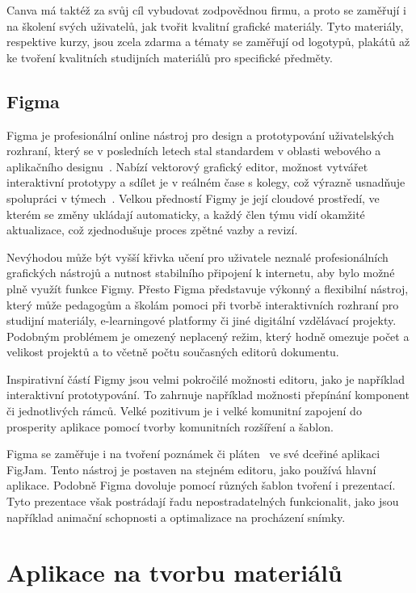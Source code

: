Canva má taktéž za svůj cíl vybudovat zodpovědnou firmu, a proto se zaměřují i na školení svých uživatelů, jak tvořit kvalitní grafické materiály.
Tyto materiály, respektive kurzy, jsou zcela zdarma a tématy se zaměřují od logotypů, plakátů až ke tvoření kvalitních studijních materiálů pro specifické předměty.


\subsection{Figma}\label{text:figma_popis}

Figma je profesionální online nástroj pro design a prototypování uživatelských rozhraní, který se v posledních letech stal standardem v oblasti webového a aplikačního designu~\cite{figma_website}. 
Nabízí vektorový grafický editor, možnost vytvářet interaktivní prototypy a sdílet je v reálném čase s kolegy, což výrazně usnadňuje spolupráci v týmech~\cite{figma_website}. 
Velkou předností Figmy je její cloudové prostředí, ve kterém se změny ukládají automaticky, a každý člen týmu vidí okamžité aktualizace, což zjednodušuje proces zpětné vazby a revizí. 

Nevýhodou může být vyšší křivka učení pro uživatele neznalé profesionálních grafických nástrojů a nutnost stabilního připojení k internetu, aby bylo možné plně využít funkce Figmy. 
Přesto Figma představuje výkonný a flexibilní nástroj, který může pedagogům a školám pomoci při tvorbě interaktivních rozhraní pro studijní materiály, e-learningové platformy či jiné digitální vzdělávací projekty.
Podobným problémem je omezený neplacený režim, který hodně omezuje počet a velikost projektů a to včetně počtu současných editorů dokumentu.

Inspirativní částí Figmy jsou velmi pokročilé možnosti editoru, jako je například interaktivní prototypování.
To zahrnuje například možnosti přepínání komponent či jednotlivých rámců.
Velké pozitivum je i velké komunitní zapojení do prosperity aplikace pomocí tvorby komunitních rozšíření a šablon.

Figma se zaměřuje i na tvoření poznámek či pláten~\cite{figma_figjam} ve své dceřiné aplikaci FigJam.
Tento nástroj je postaven na stejném editoru, jako používá hlavní aplikace.
Podobně Figma dovoluje pomocí různých šablon tvoření i prezentací.
Tyto prezentace však postrádají řadu nepostradatelných funkcionalit, jako jsou například animační schopnosti a optimalizace na procházení snímky.

\section{Aplikace na tvorbu materiálů}

